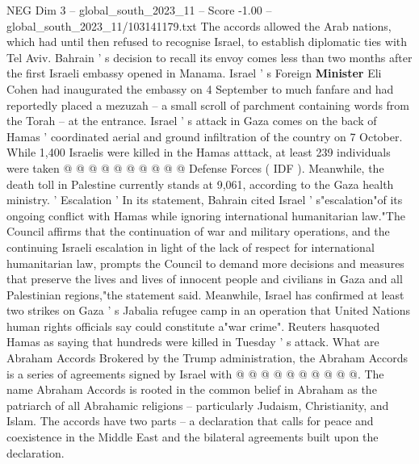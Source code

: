 \begin{textsample}{NEG Dim 3 – global\_south\_2023\_11 – Score -1.00 – global\_south\_2023\_11/103141179.txt}
The accords allowed the Arab nations, which had until then refused to recognise Israel, to establish diplomatic ties with Tel Aviv.
Bahrain ' s decision to recall its envoy comes less than two months after the first Israeli embassy opened in Manama.
Israel ' s Foreign \textbf{Minister} Eli Cohen had inaugurated the embassy on 4 September to much fanfare and had reportedly placed a mezuzah -- a small scroll of parchment containing words from the Torah -- at the entrance.
Israel ' s attack in Gaza comes on the back of Hamas ' coordinated aerial and ground infiltration of the country on 7 October.
While 1,400 Israelis were killed in the Hamas atttack, at least 239 individuals were taken @ @ @ @ @ @ @ @ @ @ Defense Forces ( IDF ).
Meanwhile, the death toll in Palestine currently stands at 9,061, according to the Gaza health ministry. ' Escalation ' In its statement, Bahrain cited Israel ' s"escalation"of its ongoing conflict with Hamas while ignoring international humanitarian law."The Council affirms that the continuation of war and military operations, and the continuing Israeli escalation in light of the lack of respect for international humanitarian law, prompts the Council to demand more decisions and measures that preserve the lives and lives of innocent people and civilians in Gaza and all Palestinian regions,"the statement said.
Meanwhile, Israel has confirmed at least two strikes on Gaza ' s Jabalia refugee camp in an operation that United Nations human rights officials say could constitute a"war crime".
Reuters hasquoted Hamas as saying that hundreds were killed in Tuesday ' s attack.
What are Abraham Accords Brokered by the Trump administration, the Abraham Accords is a series of agreements signed by Israel with @ @ @ @ @ @ @ @ @ @.
The name Abraham Accords is rooted in the common belief in Abraham as the patriarch of all Abrahamic religions -- particularly Judaism, Christianity, and Islam.
The accords have two parts -- a declaration that calls for peace and coexistence in the Middle East and the bilateral agreements built upon the declaration.

\end{textsample}
